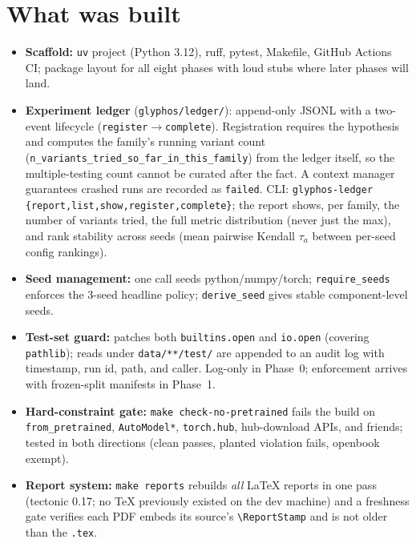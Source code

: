 \documentclass[11pt]{article}
\begin{document}
\section{What was built}
\begin{itemize}
  \item \textbf{Scaffold:} \texttt{uv} project (Python 3.12), ruff, pytest,
        Makefile, GitHub Actions CI; package layout for all eight phases with
        loud stubs where later phases will land.
  \item \textbf{Experiment ledger} (\texttt{glyphos/ledger/}): append-only
        JSONL with a two-event lifecycle
        (\texttt{register}$\to$\texttt{complete}). Registration requires the
        hypothesis and computes the family's running variant count
        (\texttt{n\_variants\_tried\_}\allowbreak\texttt{so\_far\_in\_this\_family})
        from the ledger itself, so the multiple-testing count cannot be
        curated after the fact. A context manager guarantees crashed runs are recorded as
        \texttt{failed}. CLI: \texttt{glyphos-ledger
        \{report,list,show,register,complete\}}; the report shows, per family,
        the number of variants tried, the full metric distribution (never
        just the max), and rank stability across seeds (mean pairwise Kendall
        $\tau_a$ between per-seed config rankings).
  \item \textbf{Seed management:} one call seeds python/numpy/torch;
        \texttt{require\_seeds} enforces the 3-seed headline policy;
        \texttt{derive\_seed} gives stable component-level seeds.
  \item \textbf{Test-set guard:} patches both \texttt{builtins.open} and
        \texttt{io.open} (covering \texttt{pathlib}); reads under
        \texttt{data/**/test/} are appended to an audit log with timestamp,
        run id, path, and caller. Log-only in Phase~0; enforcement arrives
        with frozen-split manifests in Phase~1.
  \item \textbf{Hard-constraint gate:} \texttt{make check-no-pretrained}
        fails the build on \texttt{from\_pretrained}, \texttt{AutoModel*},
        \texttt{torch.hub}, hub-download APIs, and friends; tested in both
        directions (clean passes, planted violation fails, openbook exempt).
  \item \textbf{Report system:} \texttt{make reports} rebuilds \emph{all}
        \LaTeX{} reports in one pass (tectonic 0.17; no TeX previously existed
        on the dev machine) and a freshness gate verifies each PDF embeds its
        source's \texttt{\textbackslash ReportStamp} and is not older than the
        \texttt{.tex}.
\end{itemize}
\end{document}
